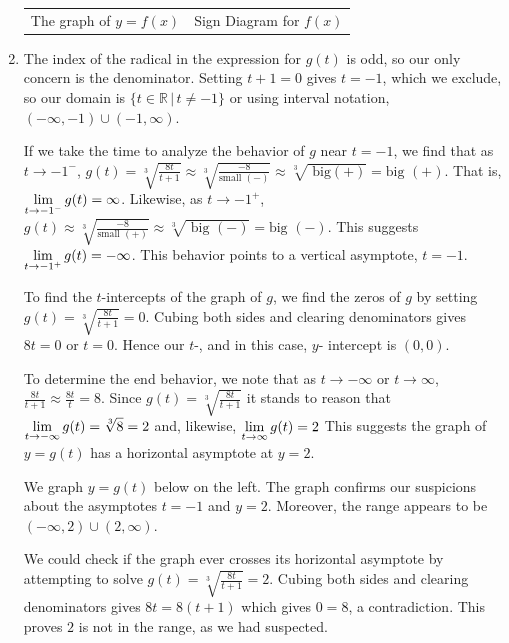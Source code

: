 \documentclass{ximera}
\begin{document}
\begin{ex}
\begin{enumerate}
\begin{center}
\begin{tabular}{cc}
The graph of $y=f(x)$  \hspace{0.75in} & Sign Diagram for $f(x)$ \\


\end{tabular}
\end{center} 


\item  The index of the radical  in the expression for $g(t)$ is odd, so our only concern is the denominator.  Setting $t+1=0$ gives $t=-1$, which we exclude, so our domain is $\{ t \in \mathbb{R} \, | \, t \neq -1\}$ or using interval notation, $(-\infty, -1) \cup (-1, \infty)$.    

If we take the time to analyze the behavior of $g$ near $t=-1$, we find that as $t \rightarrow -1^{-}$, $g(t) = \sqrt[3]{\frac{8t}{t+1}}  \approx \sqrt[3]{\frac{-8}{\text{small $(-)$}}}  \approx \sqrt[3]{\text{ big$(+)$}} = \text{big $(+)$}$.  That is, $\ds{\lim_{t \rightarrow -1^{-}} g(t) = \infty}$.  Likewise, as $t \rightarrow -1^{+}$, $g(t)  \approx \sqrt[3]{\frac{-8}{\text{small $(+)$}}}  \approx \sqrt[3]{\text{ big $(-)$}} = \text{big $(-)$}$.  This suggests  $\ds{\lim_{t \rightarrow -1^{+}} g(t) = -\infty}$.  This behavior points to a vertical asymptote, $t=-1$.

To find the $t$-intercepts of the graph of $g$, we find the zeros of $g$ by setting $g(t) = \sqrt[3]{\frac{8t}{t+1}} = 0$.  Cubing both sides and clearing denominators  gives $8t = 0$ or $t = 0$.  Hence our  $t$-, and in this case,  $y$- intercept is $(0,0)$.

To determine the end behavior, we note that as $t \rightarrow  -\infty$ or $t \rightarrow  \infty$,  $\frac{8t}{t+1} \approx \frac{8t}{t} = 8$.  Since  $g(t) = \sqrt[3]{\frac{8t}{t+1}}$  it stands to reason that $\ds{\lim_{ t \rightarrow -\infty} g(t) =  \sqrt[3]{8} = 2}$ and, likewise, $\ds{\lim_{ t \rightarrow \infty} g(t) = 2}$  This suggests the graph of $y = g(t)$ has a horizontal asymptote at $y = 2$.

We graph $y = g(t)$ below on the left. The graph confirms our suspicions about the asymptotes $t = -1$ and $y = 2$.  Moreover, the range appears to be $(-\infty, 2) \cup (2, \infty)$.  

We could check if the graph ever crosses its horizontal asymptote by attempting to solve $g(t) =  \sqrt[3]{\frac{8t}{t+1}} = 2$.  Cubing both sides and clearing denominators gives $8t = 8(t+1)$ which gives $0 = 8$, a contradiction.  This proves $2$ is not in the range, as we had suspected. 


\end{enumerate}
\end{ex}
\end{document}
